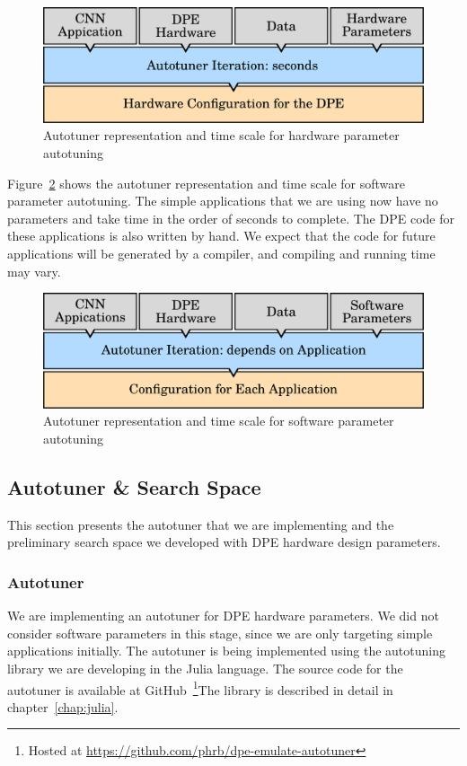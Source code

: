\begin{figure}[htpb]
    \centering
    \includegraphics[width=.65\textwidth]{./images/overview_dpe_hard}
    \caption{Autotuner representation and time scale for hardware parameter
    autotuning}
    \label{fig:overview-dpe-hard}
\end{figure}

Figure~\ref{fig:overview-dpe-app} shows the autotuner representation and time
scale for software parameter autotuning. The simple applications that we are
using now have no parameters and take time in the order of seconds to complete.
The DPE code for these applications is also written by hand. We expect that the
code for future applications will be generated by a compiler, and compiling and
running time may vary.

\begin{figure}[htpb]
    \centering
    \includegraphics[width=.65\textwidth]{./images/overview_dpe_app}
    \caption{Autotuner representation and time scale for software parameter
    autotuning}
    \label{fig:overview-dpe-app}
\end{figure}

\subsection{Autotuner \& Search Space}
\label{sec:DPEautotuning}

This section presents the autotuner that we are implementing and the
preliminary search space we developed with DPE hardware design parameters.

\subsubsection{Autotuner}

We are implementing an autotuner for DPE hardware parameters.  We did not
consider software parameters in this stage, since we are only targeting simple
applications initially. The autotuner is being implemented using the autotuning
library we are developing in the Julia language. The source code for the
autotuner is available at GitHub~\footnote{Hosted at
\url{https://github.com/phrb/dpe-emulate-autotuner}}The library is described in
detail in chapter~\ref{chap:julia}.

